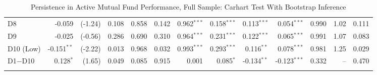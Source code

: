 \begin{table}[!htbp]
{\begin{tabular*}{\linewidth}{@{\extracolsep{\fill}}lrrrrrrrrrrrr}
\hspace{1em}D8 & -0.059 & (-1.24) & 0.108 & 0.858 & 0.142 & 0.962$^{***}$ & 0.158$^{***}$ & 0.113$^{***}$ & 0.054$^{***}$ & 0.990 & 1.02 & 0.111\\
\hspace{1em}D9 & -0.025 & (-0.56) & 0.286 & 0.690 & 0.310 & 0.964$^{***}$ & 0.231$^{***}$ & 0.122$^{***}$ & 0.065$^{***}$ & 0.991 & 1.07 & 0.083\\
\hspace{1em}D10 (Low) & -0.151$^{**}$ & (-2.22) & 0.013 & 0.968 & 0.032 & 0.993$^{***}$ & 0.293$^{***}$ & 0.116$^{**}$ & 0.078$^{***}$ & 0.981 & 1.25 & 0.029\\
\hspace{1em}D1$-$D10 & 0.128$^{*}$ & (1.65) & 0.049 & 0.085 & 0.915 & 0.001 & 0.085$^{*}$ & -0.134$^{**}$ & -0.123$^{***}$ & 0.332 & -- & 0.470\\
\addlinespace[0.3em]
\hline
\bottomrule
\end{tabular*}%
}\sbefit
\fi
\setlength{\tabletempwidth}{\wd\tabletempbox}
\ifdim\tabletempwidth>\linewidth\setlength{\tabletempwidth}{\linewidth}\fi
\begin{minipage}{\tabletempwidth}
\captionsetup{width=\linewidth}
\caption{Persistence in Active Mutual Fund Performance, Full Sample: Carhart Test With Bootstrap Inference}\label{tab:persistence}
\ifdim\wd\tabletempbox>\linewidth
  \resizebox{\linewidth}{!}{\usebox{\tabletempbox}}
\else
  \usebox{\tabletempbox}
\fi
\par\medskip
\begin{singlespace}\tablefont\noindent

\end{singlespace}
\end{minipage}
\end{table}
